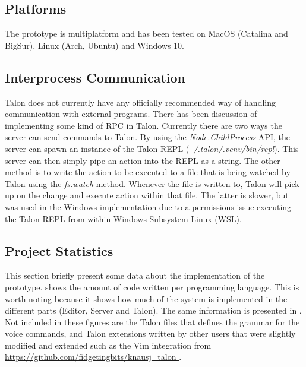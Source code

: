 \documentclass[../thesis.tex]{subfiles}
\begin{document}
\subsection{Platforms}
The prototype is multiplatform and has been tested on MacOS (Catalina and BigSur), Linux (Arch, Ubuntu) and Windows 10.

\subsection{Interprocess Communication}
Talon does not currently have any officially recommended way of handling communication with external programs.
There has been discussion of implementing some kind of RPC in Talon.
Currently there are two ways the server can send commands to Talon.
By using the \textit{Node.ChildProcess} API, the server can spawn an instance of the Talon REPL (\textit{~/.talon/.venv/bin/repl}).
This server can then simply pipe an action into the REPL as a string.
The other method is to write the action to be executed to a file that is being watched by Talon using the \textit{fs.watch}
method. Whenever the file is written to, Talon will pick up on the change and execute action within that file.
The latter is slower, but was used in the Windows implementation due to a permissions issue executing the Talon REPL from within Windows Subsystem Linux (WSL).



\subsection{Project Statistics}%
\label{sub:project_statistics}
This section briefly present some data about the implementation of the prototype.
 shows the amount of code written per programming language.
This is worth noting because it shows how much of the system is implemented in the different parts
(Editor, Server and Talon).
The same information is presented in .
Not included in these figures are the Talon files that defines the grammar for the voice commands,
and Talon extensions written by other users that were slightly modified and extended such as the Vim integration from \url{https://github.com/fidgetingbits/knausj_talon
}.

%   
\end{document}
